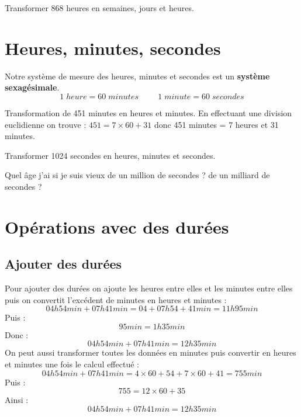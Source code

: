 \documentclass[a4paper,dvipsnames]{article}
\begin{document}
\begin{ExOApp}[]
Transformer 868 heures en semaines, jours et heures.
\end{ExOApp}

\section{Heures, minutes, secondes}

\begin{Def}
Notre système de mesure des heures, minutes et secondes est un \textbf{système sexagésimale}.
\[1\;heure=60\;minutes\hspace{1cm}1\;minute=60\;secondes\]
\end{Def}

\begin{Mt}
Transformation de 451 minutes en heures et minutes.
En effectuant une division euclidienne on trouve :
$451=7\times60+31$ donc 451 minutes = 7 heures et 31 minutes.
\end{Mt}

\begin{ExOApp}[]
Transformer 1024 secondes en heures, minutes et secondes.
\end{ExOApp}

\begin{autoeval}
Quel âge j'ai si je suis vieux de un million de secondes ? de un milliard de secondes ?
\end{autoeval}

\section{Opérations avec des durées}

\subsection{Ajouter des durées}

\begin{Mt}
Pour ajouter des durées on ajoute les heures entre elles et les minutes entre elles puis on convertit l'excédent de minutes en heures et minutes :
\[04h54min+07h41min=04+07h54+41min=11h95min\]
Puis :
\[95min=1h35min\]
Donc :
\[04h54min+07h41min=12h35min\]
On peut aussi transformer toutes les données en minutes puis convertir en heures et minutes une fois le calcul effectué :
\[04h54min+07h41min=4\times60+54+7\times60+41
=755min\]
Puis :
\[755=12\times60+35\]
Ainsi :
\[04h54min+07h41min=12h35min\]
\end{Mt}
\end{document}
